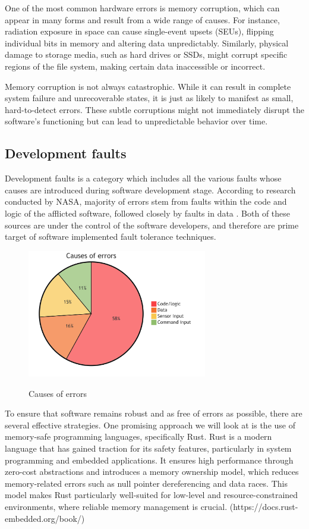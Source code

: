 \documentclass[12pt, letterpaper]{article}
\begin{document}
One of the most common hardware errors is memory corruption, which can appear in many forms and result from a wide range of causes. For instance, radiation exposure in space can cause single-event upsets (SEUs), flipping individual bits in memory and altering data unpredictably. Similarly, physical damage to storage media, such as hard drives or SSDs, might corrupt specific regions of the file system, making certain data inaccessible or incorrect.

Memory corruption is not always catastrophic. While it can result in complete system failure and unrecoverable states, it is just as likely to manifest as small, hard-to-detect errors. These subtle corruptions might not immediately disrupt the software's functioning but can lead to unpredictable behavior over time.

\subsection{Development faults}

Development faults is a category which includes all the various faults whose causes are introduced during software development stage. According to research conducted by NASA, majority of errors stem from faults within the code and logic of the afflicted software, followed closely by faults in data \cite{nasa:stats}. Both of these sources are under the control of the software developers, and therefore are prime target of software implemented fault tolerance techniques.

\begin{figure}[hbt]
    \centering
    \includegraphics[width=0.7\textwidth]{diagrams/stats/piechart.png}
    \caption{Causes of errors}
    \cite{nasa:stats}
\end{figure}

To ensure that software remains robust and as free of errors as possible, there are several effective strategies. One promising approach we will look at is the use of memory-safe programming languages, specifically Rust. Rust is a modern language that has gained traction for its safety features, particularly in system programming and embedded applications. It ensures high performance through zero-cost abstractions and introduces a memory ownership model, which reduces memory-related errors such as null pointer dereferencing and data races. This model makes Rust particularly well-suited for low-level and resource-constrained environments, where reliable memory management is crucial. (https://docs.rust-embedded.org/book/) \\
\end{document}
